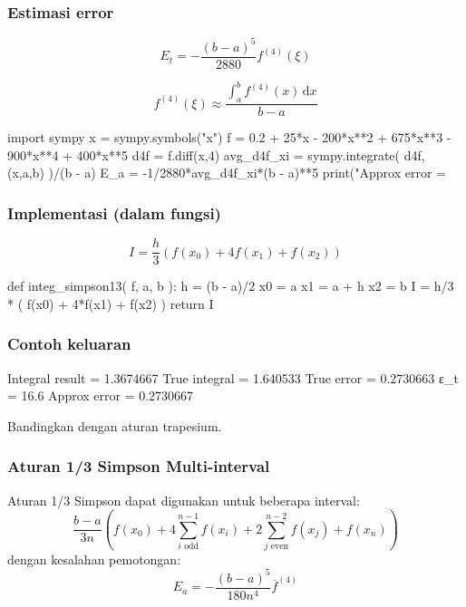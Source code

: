 \begin{frame}[fragile]
\frametitle{Estimasi error}

\begin{equation*}
E_{t} = -\frac{(b-a)^5}{2880} f^{(4)}(\xi)
\end{equation*}

\begin{equation*}
f^{(4)}(\xi) \approx \dfrac{\int_{a}^{b} f^{(4)}(x) \, \mathrm{d}x}{b - a}
\end{equation*}

\begin{pythoncode}
import sympy
x = sympy.symbols("x")
f = 0.2 + 25*x - 200*x**2 + 675*x**3 - 900*x**4 + 400*x**5
d4f = f.diff(x,4)
avg_d4f_xi = sympy.integrate( d4f, (x,a,b) )/(b - a)
E_a = -1/2880*avg_d4f_xi*(b - a)**5
print("Approx error    = %
\end{pythoncode}

\end{frame}




\begin{frame}[fragile]
\frametitle{Implementasi (dalam fungsi)}

\begin{equation*}
I = \frac{h}{3}( f(x_0) + 4f(x_1) + f(x_2) )
\end{equation*}

\begin{pythoncode}
def integ_simpson13( f, a, b ):
    h = (b - a)/2
    x0 = a
    x1 = a + h
    x2 = b
    I = h/3 * ( f(x0) + 4*f(x1) + f(x2) )
    return I
\end{pythoncode}

\end{frame}



\begin{frame}[fragile]
\frametitle{Contoh keluaran}

\begin{textcode}
Integral result = 1.3674667
True integral   = 1.640533
True error      = 0.2730663
ε_t             = 16.6%
Approx error    = 0.2730667    
\end{textcode}

Bandingkan dengan aturan trapesium.

\end{frame}




\begin{frame}
\frametitle{Aturan 1/3 Simpson Multi-interval}

Aturan 1/3 Simpson dapat digunakan untuk beberapa interval:
\begin{equation*}
\frac{b-a}{3n} \left(
f(x_0) + 4\sum_{i\text{ odd}}^{n-1} f(x_i) + 2 \sum_{j\text{ even}}^{n-2} f(x_j) + f(x_n)
\right)
\end{equation*}
dengan kesalahan pemotongan:
\begin{equation*}
E_{a} = -\frac{(b-a)^5}{180n^4} \overline{f}^{(4)}
\end{equation*}

\end{frame}


